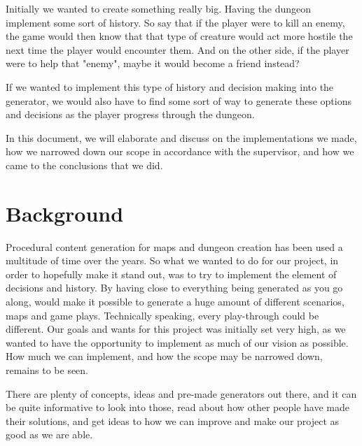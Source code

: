 \documentclass[conference,compsoc]{IEEEtran}
\begin{document}
Initially we wanted to create something really big. Having the dungeon implement some sort of history. So say that if the player were to kill an enemy, the game would then know that that type of creature would act more hostile the next time the player would encounter them. And on the other side, if the player were to help that "enemy", maybe it would become a friend instead?

If we wanted to implement this type of history and decision making into the generator, we would also have to find some sort of way to generate these options and decisions as the player progress through the dungeon.

In this document, we will elaborate and discuss on the implementations we made, how we narrowed down our scope in accordance with the supervisor, and how we came to the conclusions that we did.
	
\section{Background}
Procedural content generation for maps and dungeon creation has been used a multitude of time over the years. So what we wanted to do for our project, in order to hopefully make it stand out, was to try to implement the element of decisions and history. By having close to everything being generated as you go along, would make it possible to generate a huge amount of different scenarios, maps and game plays. Technically speaking, every play-through could be different. 
Our goals and wants for this project was initially set very high, as we wanted to have the opportunity to implement as much of our vision as possible. How much we can implement, and how the scope may be narrowed down, remains to be seen.

There are plenty of concepts, ideas and pre-made generators out there, and it can be quite informative to look into those, read about how other people have made their solutions, and get ideas to how we can improve and make our project as good as we are able.
\end{document}
